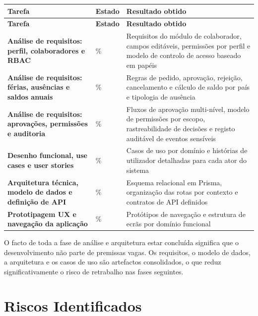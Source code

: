 \documentclass[11pt,a4paper,twoside]{article}
\newcommand{\tH}[1]{\textbf{\sffamily\small\color{white}#1}}
\newcommand{\theadrow}{\rowcolor{ACCENT}}
\begin{document}
\begin{longtable}{>{\small\bfseries}p{5.8cm} >{\small\centering\arraybackslash}p{1.8cm} >{\small}p{5.5cm}}
\theadrow
\tH{Tarefa} & \tH{Estado} & \tH{Resultado obtido} \\
\midrule
\endfirsthead
\theadrow
\tH{Tarefa} & \tH{Estado} & \tH{Resultado obtido} \\
\midrule
\endhead
Análise de requisitos: perfil, colaboradores e RBAC & 100\% & Requisitos do módulo de colaborador, campos editáveis, permissões por perfil e modelo de controlo de acesso baseado em papéis \\
Análise de requisitos: férias, ausências e saldos anuais & 100\% & Regras de pedido, aprovação, rejeição, cancelamento e cálculo de saldo por país e tipologia de ausência \\
Análise de requisitos: aprovações, permissões e auditoria & 100\% & Fluxos de aprovação multi-nível, modelo de permissões por escopo, rastreabilidade de decisões e registo auditável de eventos sensíveis \\
Desenho funcional, use cases e user stories & 100\% & Casos de uso por domínio e histórias de utilizador detalhadas para cada ator do sistema \\
Arquitetura técnica, modelo de dados e definição de API & 100\% & Esquema relacional em Prisma, organização das rotas por contexto e contratos de API definidos \\
Prototipagem UX e navegação da aplicação & 100\% & Protótipos de navegação e estrutura de ecrãs por domínio funcional \\
\bottomrule
\end{longtable}

\begin{callout}
O facto de toda a fase de análise e arquitetura estar concluída significa que o desenvolvimento não parte de premissas vagas. Os requisitos, o modelo de dados, a arquitetura e os casos de uso são artefactos consolidados, o que reduz significativamente o risco de retrabalho nas fases seguintes.
\end{callout}

\section{Riscos Identificados}
\end{document}
